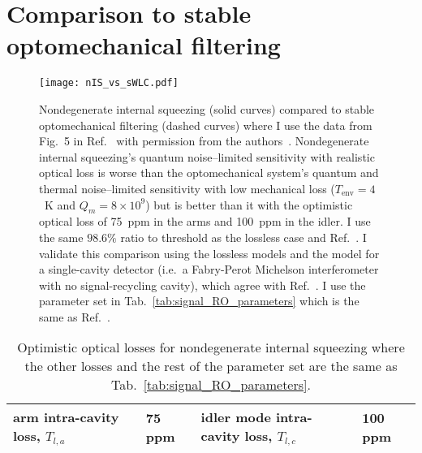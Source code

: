 
\section{Comparison to stable optomechanical filtering} %
\label{sec:nIS_vs_sWLC}

\begin{figure}
	\centering
	\texttt{[image: nIS\_vs\_sWLC.pdf]}
	\caption{Nondegenerate internal squeezing (solid curves) compared to stable optomechanical filtering (dashed curves) where I use the data from Fig.~5 in Ref.~\cite{liBroadbandSensitivityImprovement2020} with permission from the authors~\cite{xiangLiPersonalCommunication}. Nondegenerate internal squeezing's quantum noise--limited sensitivity with realistic optical loss is worse than the optomechanical system's quantum and thermal noise--limited sensitivity with low mechanical loss ($T_\text{env}=4$~K and $Q_m=8\times10^9$) but is better than it with the optimistic optical loss of 75~ppm in the arms and 100~ppm in the idler. I use the same $98.6\%$ ratio to threshold as the lossless case and Ref.~\cite{liBroadbandSensitivityImprovement2020}. I validate this comparison using the lossless models and the model for a single-cavity detector (i.e.\ a Fabry-Perot Michelson interferometer with no signal-recycling cavity), which agree with Ref.~\cite{liBroadbandSensitivityImprovement2020}. I use the parameter set in Tab.~\ref{tab:signal_RO_parameters} which is the same as Ref.~\cite{liBroadbandSensitivityImprovement2020}.}
	\label{fig:nIS_vs_sWLC}
\end{figure}

\begin{table}
\centering
\begin{tabular}{@{}ll|ll@{}}
\toprule
arm intra-cavity loss, $T_{l,a}$ & 75 ppm & idler mode intra-cavity loss, $T_{l,c}$ & 100 ppm \\ \bottomrule
\end{tabular}
\caption{Optimistic optical losses for nondegenerate internal squeezing where the other losses and the rest of the parameter set are the same as Tab.~\ref{tab:signal_RO_parameters}.}
\label{tab:ideal_loss}
\end{table}


